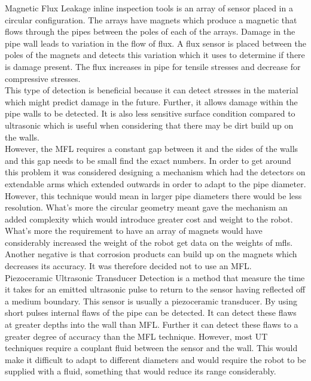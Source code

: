 \documentclass[11pt]{article}		%
\begin{document}
        Magnetic Flux Leakage inline inspection tools is an array of sensor placed in a circular configuration. 
        The arrays have magnets which produce a magnetic that flows through the pipes between the poles of each of the arrays. 
        Damage in the pipe wall leads to variation in the flow of flux. 
        A flux sensor is placed between the poles of the magnets and detects this variation which it uses to determine if there is damage present. 
        The flux increases in pipe for tensile stresses and decrease for compressive stresses.
        \\
        This type of detection is beneficial because it can detect stresses in the material which might predict damage in the future.
        Further, it allows damage within the pipe walls to be detected. 
        It is also less sensitive surface condition compared to ultrasonic which is useful when considering that there may be dirt build up on the walls.
        \\
        However, the MFL requires a constant gap between it and the sides of the walls and this gap needs to be small find the exact numbers. 
        In order to get around this problem it was considered designing a mechanism which had the detectors on extendable arms which extended outwards in order to adapt to the pipe diameter. 
        However, this technique would mean in larger pipe diameters there would be less resolution. 
        What’s more the circular geometry meant gave the mechanism an added complexity which would introduce greater cost and weight to the robot. 
        What’s more the requirement to have an array of magnets would have considerably increased the weight of the robot get data on the weights of mfls. 
        Another negative is that corrosion products can build up on the magnets which decreases its accuracy. It was therefore decided not to use an MFL.
        \\
        Piezoceramic Ultrasonic Transducer Detection is a method that measure the time it takes for an emitted ultrasonic pulse to return to the sensor having reflected off a medium boundary. 
        This sensor is usually a piezoceramic transducer.
        By using short pulses internal flaws of the pipe can be detected.
        It can detect these flaws at greater depths into the wall than MFL.  
        Further it can detect these flaws to a greater degree of accuracy than the MFL technique.  %
        However, most UT techniques require a couplant fluid between the sensor and the wall. 
        This would make it difficult to adapt to different diameters and would require the robot to be supplied with a fluid, something that would reduce its range considerably.
\end{document}
